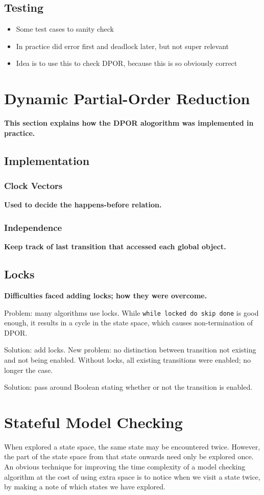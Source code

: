 \documentclass[12pt,a4paper,twoside,openright]{report}
\begin{document}
\subsection{Testing}
\begin{itemize}
	\item Some test cases to sanity check
	\item In practice did error first and deadlock later,
		but not super relevant
	\item Idea is to use this to check DPOR, because this is so 
		obviously correct
\end{itemize}

\section{Dynamic Partial-Order Reduction}
\textbf{This section explains how the DPOR
	alogorithm was implemented in practice.}

\subsection{Implementation}
\subsubsection{Clock Vectors}
\textbf{Used to decide the happens-before relation.}
\subsubsection{Independence}
\textbf{Keep track of last transition that accessed
	each global object.}

\subsection{Locks}
\textbf{Difficulties faced adding locks;
	how they were overcome.}

Problem: many algorithms use locks. While \texttt{while locked do skip done}
is good enough, it results in a cycle in the state space, which causes
non-termination of DPOR.

Solution: add locks. New problem: no distinction between
transition not existing and not being enabled. Without
locks, all existing transitions were enabled; no longer
the case.

Solution: pass around Boolean stating whether or not the transition
is enabled.

\section{Stateful Model Checking}
When explored a state space, the same state may be
encountered twice. However, the part of the state
space from that state onwards need only be explored
once. An obvious technique for improving the
time complexity of a model checking algorithm
at the cost of using extra space is to notice
when we visit a state twice, by making a note
of which states we have explored.
\end{document}
